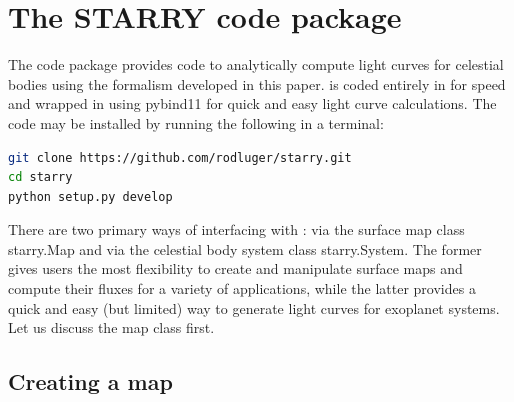 \documentclass[modern]{aastex61}
\begin{document}
\section{The \textbf{STARRY} code package}
\label{sec:starrycode}

The \starry code package provides code to analytically
compute light curves for celestial bodies using the formalism developed
in this paper. \starry is coded entirely in \cpp for speed and wrapped
in \Python using \textsf{pybind11} \citep{pybind11} for quick and easy
light curve calculations. The
code may be installed by running the following in a terminal:
%
\begin{lstlisting}[language=bash]
git clone https://github.com/rodluger/starry.git
cd starry
python setup.py develop
\end{lstlisting}
%
There are two primary ways of interfacing with \starry: via the surface
map class \textsf{starry.Map} and via the celestial body system class
\textsf{starry.System}. The former gives users the most flexibility to
create and manipulate surface maps and compute their fluxes for a variety
of applications, while the latter provides a quick and easy (but limited)
way to generate light curves for exoplanet systems. Let us
discuss the map class first.

\subsection{Creating a map}
\label{sec:starrymap}
\end{document}
